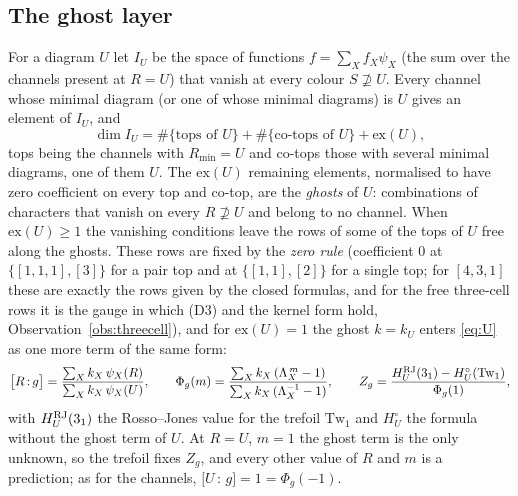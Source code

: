 \documentclass[11pt]{article}
\newcommand{\Tw}{\mathrm{Tw}}
\newcommand{\Lam}{\Lambda}
\newcommand{\cf}[2]{\bigl[#1\,{:}\,#2\bigr]}
\begin{document}
\subsection{The ghost layer}\label{sec:ghosts}

For a diagram $U$ let $I_U$ be the space of functions $f=\sum_Xf_X\psi_X$ (the sum over the channels present at $R=U$)
that vanish at every colour $S\not\supseteq U$.  Every channel whose minimal diagram (or one of whose minimal diagrams) is
$U$ gives an element of $I_U$, and
\[
\dim I_U=\#\{\text{tops of }U\}+\#\{\text{co-tops of }U\}+\mathrm{ex}(U),
\]
tops being the channels with $R_{\min}=U$ and co-tops those with several minimal diagrams, one of them $U$.  The
$\mathrm{ex}(U)$ remaining elements, normalised to have zero coefficient on every top and co-top, are the \emph{ghosts} of
$U$: combinations of characters that vanish on every $R\not\supseteq U$ and belong to no channel.  When
$\mathrm{ex}(U)\ge1$ the vanishing conditions leave the rows of some of the tops of $U$ free along the ghosts.  These rows
are fixed by the \emph{zero rule} (coefficient $0$ at $\{[1,1,1],[3]\}$ for a pair top and at $\{[1,1],[2]\}$ for a single
top; for $[4,3,1]$ these are exactly the rows given by the closed formulas, and for the free three-cell rows it is the
gauge in which (D3) and the kernel form hold, Observation~\ref{obs:threecell}), and for $\mathrm{ex}(U)=1$ the ghost
$k=k_U$ enters \eqref{eq:U} as one more term of the same form:
\begin{equation}\label{eq:ghost}
\cf Rg=\frac{\sum_Xk_X\,\psi_X(R)}{\sum_Xk_X\,\psi_X(U)},\qquad
\Phi_g(m)=\frac{\sum_Xk_X\,(\Lam_X^{\,m}-1)}{\sum_Xk_X\,(\Lam_X^{-1}-1)},\qquad
Z_g=\frac{H_U^{\rm RJ}(3_1)-H_U^{\circ}(\Tw_1)}{\Phi_g(1)},
\end{equation}
with $H^{\rm RJ}_U(3_1)$ the Rosso--Jones value for the trefoil $\Tw_1$ and $H^\circ_U$ the formula without the ghost term
of $U$.  At $R=U$, $m=1$ the ghost term is the only unknown, so the trefoil fixes $Z_g$, and every other value of $R$ and
$m$ is a prediction; as for the channels, $\cf Ug=1=\Phi_g(-1)$.
\end{document}
